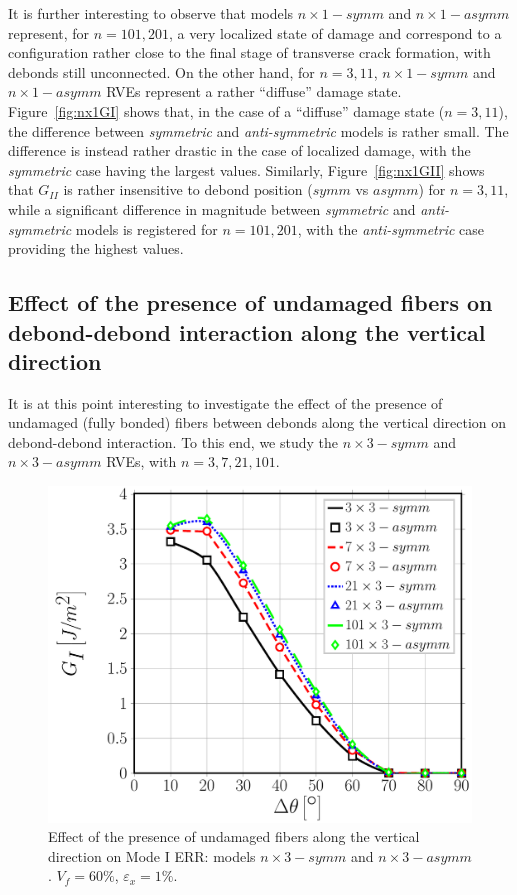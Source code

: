 \documentclass[smallextended]{svjour3}       %
\begin{document}
It is further interesting to observe that models $n\times1-symm$ and $n\times1-asymm$ represent, for $n=101,201$, a very localized state of damage and correspond to a configuration rather close to the final stage of transverse crack formation, with debonds still unconnected. On the other hand, for $n=3,11$, $n\times1-symm$ and $n\times1-asymm$ RVEs represent a rather ``diffuse'' damage state. Figure~\ref{fig:nx1GI} shows that, in the case of a ``diffuse'' damage state ($n=3,11$), the difference between \textit{symmetric} and \textit{anti-symmetric} models is rather small. The difference is instead rather drastic in the case of localized damage, with the \textit{symmetric} case having the largest values. Similarly, Figure~\ref{fig:nx1GII} shows that $G_{II}$ is rather insensitive to debond position ($symm$ vs $asymm$) for $n=3,11$, while a significant difference in magnitude between \textit{symmetric} and \textit{anti-symmetric} models is registered for $n=101,201$, with the \textit{anti-symmetric} case providing the highest values.

\subsection{Effect of the presence of undamaged fibers on debond-debond interaction along the vertical direction}\label{subsec:fibersinbetween}

It is at this point interesting to investigate the effect of the presence of undamaged (fully bonded) fibers between debonds along the vertical direction on debond-debond interaction. To this end, we study the $n\times 3-symm$ and $n\times 3-asymm$ RVEs, with $n=3,7,21,101$.

\begin{figure}[!h]
\centering
\includegraphics[width=\textwidth]{nxk-coupling-vf60-GI.pdf}
\caption{Effect of the presence of undamaged fibers along the vertical direction on Mode I ERR: models $n\times 3-symm$ and $n\times 3-asymm$. $V_{f}=60\%$, $\varepsilon_{x}=1\%$.}\label{fig:nxkGI}
\end{figure}
\end{document}
